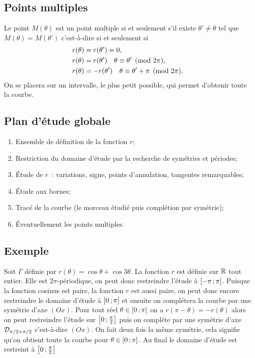 \subsection{Points multiples}
Le point $M(\theta)$ est un point multiple si et seulement s'il existe $\theta' \neq \theta$ tel que $M(\theta)=M(\theta')$ c'est-à-dire si et seulement si
\begin{align}
 r(\theta)&=r(\theta')=0, \\
 r(\theta)&=r(\theta') \quad \theta \equiv \theta' \pmod {2\pi},\\
 r(\theta)&=-r(\theta') \quad \theta \equiv \theta'+\pi \pmod {2\pi}.
\end{align}
On se placera sur un intervalle, le plus petit possible, qui permet d'obtenir toute la courbe.
\subsection{Plan d'étude globale}
\begin{enumerate}
\item Ensemble de définition de la fonction $r$;
\item Restriction du domaine d'étude par la recherche de symétries et périodes;
\item Étude de $r$~: variations, signe, points d'annulation, tangentes remarquables;
\item Étude aux bornes;
\item Tracé de la courbe (le morceau étudié puis complétion par symétrie);
\item Éventuellement les points multiples.
\end{enumerate}

\subsection{Exemple}

Soit $\Gamma$ définie par $r(\theta)=\cos \theta + \cos 3\theta$. La fonction $r$ est définie sur $\mathbb{R}$ tout entier. Elle est $2\pi$-périodique, on peut donc restreindre l'étude à $\left[ -\pi \, ;  \pi \right]$. Puisque la fonction cosinus est paire, la fonction $r$ est aussi paire, on peut donc encore restreindre le domaine d'étude à $\left[ 0 \, ;  \pi \right]$ et ensuite on complétera la courbe par une symétrie d'axe $(Ox)$. Pour tout réel $\theta \in \left[ 0 \, ;  \pi \right]$ on a $r(\pi-\theta)=-r(\theta)$ alors on peut restreindre l'étude sur $\left[ 0 \, ;  \frac{\pi}{2} \right]$ puis on compléte par une symétrie d'axe $\mathcal{D}_{\pi/2+\pi/2}$ c'est-à-dire $(Ox)$. On fait deux fois la même symétrie, cela signifie qu'on obtient toute la courbe pour $\theta \in \left[ 0 \, ;  \pi \right]$. Au final le domaine d'étude est restreint à $\left[ 0 \, ;  \frac{\pi}{2} \right]$

